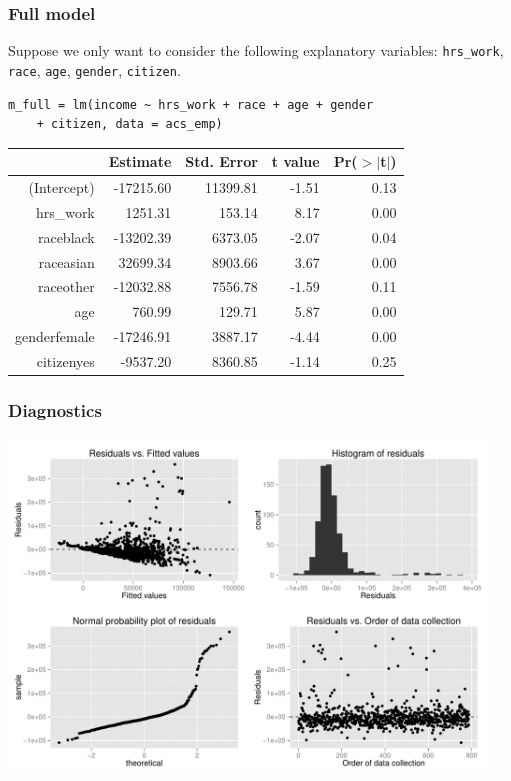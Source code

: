 \documentclass[11pt,containsverbatim,handout,xcolor=xelatex,dvipsnames,table]{beamer}
\begin{document}
\begin{frame}[fragile]
\frametitle{Full model}

Suppose we only want to consider the following explanatory variables: \texttt{hrs\_work}, \texttt{race}, \texttt{age}, \texttt{gender}, \texttt{citizen}.

{\footnotesize
\begin{Verbatim}[frame=single, formatcom=\color{blue}]
m_full = lm(income ~ hrs_work + race + age + gender 
    + citizen, data = acs_emp)
\end{Verbatim}
}

\pause

\begin{center}
{\small
\begin{tabular}{rrrrr}
  \hline
 & Estimate & Std. Error & t value & Pr($>$$|$t$|$) \\ 
  \hline
(Intercept) & -17215.60 & 11399.81 & -1.51 & 0.13 \\ 
  hrs\_work & 1251.31 & 153.14 & 8.17 & 0.00 \\ 
  raceblack & -13202.39 & 6373.05 & -2.07 & 0.04 \\ 
  raceasian & 32699.34 & 8903.66 & 3.67 & 0.00 \\ 
  raceother & -12032.88 & 7556.78 & -1.59 & 0.11 \\ 
  age & 760.99 & 129.71 & 5.87 & 0.00 \\ 
  genderfemale & -17246.91 & 3887.17 & -4.44 & 0.00 \\ 
  citizenyes & -9537.20 & 8360.85 & -1.14 & 0.25 \\ 
   \hline
\end{tabular}
}
\end{center}

\end{frame}


\begin{frame}[fragile]
\frametitle{Diagnostics}

\vspace{-0.5cm}


\begin{center}
\includegraphics[width=0.95\textwidth]{figures/acs/diag}
\end{center}


\end{frame}
\end{document}
